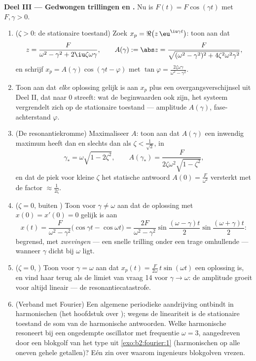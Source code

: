 \begin{problem}
\medskip
\noindent\textbf{Deel III --- Gedwongen trillingen en .}
Nu is $F(t) = F\cos(\gamma t)$ met $F, \gamma > 0$.
\begin{enumerate}[resume]
  \item ($\zeta > 0$: de stationaire toestand) Zoek $x_p =
        \Re\bigl(z\,\eu^{\iu\gamma t}\bigr)$: toon aan dat
        \[
        z = \frac{F}{\omega^2 - \gamma^2 +
        2\iu\zeta\omega\gamma},
        \qquad
        A(\gamma) := \abs z = \frac{F}{\sqrt{(\omega^2 -
        \gamma^2)^2 + 4\zeta^2\omega^2\gamma^2}} ,
        \]
        en schrijf $x_p = A(\gamma)\cos(\gamma t - \varphi)$ met
        $\tan\varphi =
        \frac{2\zeta\omega\gamma}{\omega^2-\gamma^2}$.
  \item Toon aan dat \emph{elke} oplossing gelijk is aan $x_p$ plus
        een overgangsverschijnsel uit Deel II, dat naar $0$
        streeft: wat de beginwaarden ook zijn, het systeem
        vergrendelt zich op de stationaire toestand --- amplitude
        $A(\gamma)$, fase-achterstand $\varphi$.
  \item (De resonantiekromme) Maximaliseer $A$: toon aan dat
        $A(\gamma)$ een inwendig maximum heeft dan en slechts dan
        als $\zeta < \frac{1}{\sqrt2}$, in
        \[
        \gamma_* = \omega\sqrt{1 - 2\zeta^2},
        \qquad
        A(\gamma_*) =
        \frac{F}{2\zeta\omega^2\sqrt{1-\zeta^2}} ,
        \]
        en dat de piek voor kleine $\zeta$ het statische antwoord
        $A(0) = \frac F{\omega^2}$ versterkt met de factor $\approx
        \frac{1}{2\zeta}$.
  \item ($\zeta = 0$, buiten ) Toon voor $\gamma \neq
        \omega$ aan dat de oplossing met $x(0) = x'(0) = 0$ gelijk
        is aan
        \[
        x(t) = \frac{F}{\omega^2 -
        \gamma^2}\bigl(\cos\gamma t - \cos\omega t\bigr)
        = \frac{2F}{\omega^2-\gamma^2}
        \sin\frac{(\omega-\gamma)t}{2}
        \sin\frac{(\omega+\gamma)t}{2} :
        \]
        begrensd, met \emph{zwevingen} --- een snelle trilling
        onder een trage omhullende --- wanneer $\gamma$ dicht bij
        $\omega$ ligt.
  \item ($\zeta = 0$, ) Toon voor $\gamma = \omega$ aan
        dat $x_p(t) = \frac{F}{2\omega}\,t\sin(\omega t)$ een
        oplossing is, en vind haar terug als de limiet van vraag 14
        voor $\gamma \to \omega$: de amplitude groeit voor altijd
        lineair --- de resonantiecatastrofe.
  \item (Verband met Fourier) Een algemene periodieke aandrijving
        ontbindt in harmonischen (het hoofdstuk over
        ); wegens de lineariteit is de stationaire
        toestand de som van de harmonische antwoorden. Welke
        harmonische resoneert bij een ongedempte oscillator met
        frequentie $\omega = 3$, aangedreven door een blokgolf van
        het type uit \cref{exo:b2:fourier:1} (harmonischen op alle
        oneven gehele getallen)? Eén zin over waarom ingenieurs
        blokgolven vrezen.
\end{enumerate}


\end{problem}
